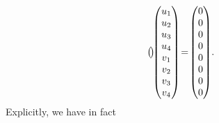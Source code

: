 \documentclass[pdftex]{sigma}
\numberwithin{equation}{section}
\theoremstyle{definition}
\newcommand{\0}{\boldsymbol{0}}
\begin{document}
\begin{gather*}
\begin{pmatrix}
\hspace{-1.5pt}\end{pmatrix} \hspace{-3.5pt}
\begin{pmatrix}
u_1
\\
u_2
\\
u_3
\\
u_4
\\
v_1
\\
v_2
\\
v_3
\\
v_4
\end{pmatrix} \!=\!
\begin{pmatrix}
0
\\
0
\\
0
\\
0
\\
0
\\
0
\\
0
\\
0
\end{pmatrix}\!.
\end{gather*}
Explicitly, we have in fact
\end{document}
